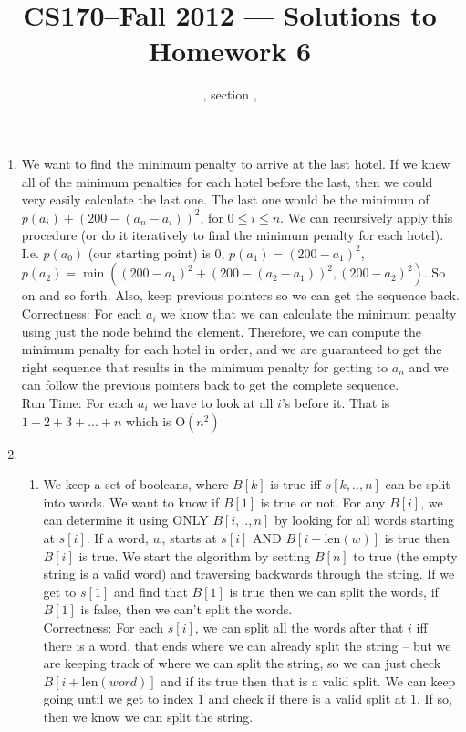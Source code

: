\documentclass[11pt]{article}
\title{CS170--Fall 2012 --- Solutions to Homework 6}
\author{\Name, section \Sec, \texttt{\Login}}
\begin{document}
\maketitle
\begin{enumerate}
\item
We want to find the minimum penalty to arrive at the last hotel. If we knew all of the minimum penalties for each hotel before the last, then we could very easily calculate the last one. The last one would be the minimum of $p(a_i)+(200-(a_n-a_i))^2$, for $0\le i \le n$. We can recursively apply this procedure (or do it iteratively to find the minimum penalty for each hotel). I.e. $p(a_0)$ (our starting point) is 0, $p(a_1)=(200-a_1)^2$, $p(a_2)=\min((200-a_1)^2+(200-(a_2-a_1))^2,(200-a_2)^2)$. So on and so forth. Also, keep previous pointers so we can get the sequence back. \\
Correctness: For each $a_i$ we know that we can calculate the minimum penalty using just the node behind the element. Therefore, we can compute the minimum penalty for each hotel in order, and we are guaranteed to get the right sequence that results in the minimum penalty for getting to $a_n$ and we can follow the previous pointers back to get the complete sequence. \\
Run Time: For each $a_i$ we have to look at all $i$'s before it. That is $1+2+3+... + n$ which is O$(n^2)$ 
\newpage
\item
\begin{enumerate}
\item We keep a set of booleans, where $B[k]$ is true iff $s[k,..,n]$ can be split into words. We want to know if $B[1]$ is true or not. For any $B[i]$, we can determine it using ONLY $B[i,..,n]$ by looking for all words starting at $s[i]$. If a word, $w$, starts at $s[i]$ AND $B[i+\text{len}(w)]$ is true then $B[i]$ is true. We start the algorithm by setting $B[n]$ to true (the empty string is a valid word) and traversing backwards through the string. If we get to $s[1]$ and find that $B[1]$ is true then we can split the words, if $B[1]$ is false, then we can't split the words.\\
Correctness: For each $s[i]$, we can split all the words after that $i$ iff there is a word, that ends where we can already split the string -- but we are keeping track of where we can split the string, so we can just check $B[i+\text{len}(word)]$ and if its true then that is a valid split. We can keep going until we get to index $1$ and check if there is a valid split at $1$. If so, then we know we can split the string.\\

\end{enumerate}
\end{enumerate}
\end{document}
